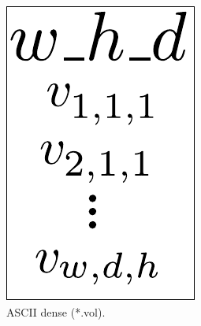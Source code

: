 \begin{figure}[htpb!]
        \centering
        \begin{subfigure}[t]{0.2\textwidth}
                \includegraphics[width=\textwidth]{img/file_format_ascii_dense}
                \caption{ASCII dense (*.vol).}
                \label{fig:file_format_ascii_dense}
        \end{subfigure}%
        ~ %
        \begin{subfigure}[t]{0.3\textwidth}

\end{subfigure}
\end{figure}
